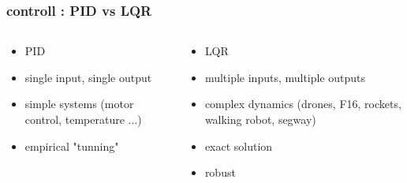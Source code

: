 \documentclass{beamer}
\begin{document}
\begin{frame}
\begin{columns}
    \end{columns}

\end{frame}



\begin{frame}
  
  \frametitle{controll : PID vs LQR}    


    \begin{columns}

      \begin{column}{0.5\textwidth}
        \begin{itemize}
          \item PID
          \item single input, single output
          \item simple systems (motor control, temperature ...)
          \item empirical "tunning" 
        \end{itemize}
      \end{column}
  
      \begin{column}{0.5\textwidth}
        \begin{itemize}
          \item LQR
          \item multiple inputs, multiple outputs
          \item complex dynamics (drones, F16, rockets, walking robot, segway)
          \item exact solution
          \item robust
        \end{itemize}
      \end{column}
  
    \end{columns}


\end{frame}
\end{document}
